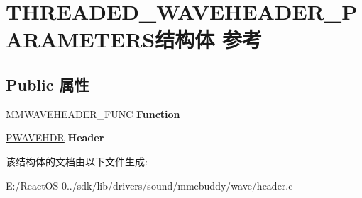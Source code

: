 \hypertarget{struct_t_h_r_e_a_d_e_d___w_a_v_e_h_e_a_d_e_r___p_a_r_a_m_e_t_e_r_s}{}\section{T\+H\+R\+E\+A\+D\+E\+D\+\_\+\+W\+A\+V\+E\+H\+E\+A\+D\+E\+R\+\_\+\+P\+A\+R\+A\+M\+E\+T\+E\+R\+S结构体 参考}
\label{struct_t_h_r_e_a_d_e_d___w_a_v_e_h_e_a_d_e_r___p_a_r_a_m_e_t_e_r_s}
\subsection*{Public 属性}
\begin{DoxyCompactItemize}
\item 
\mbox{\label{struct_t_h_r_e_a_d_e_d___w_a_v_e_h_e_a_d_e_r___p_a_r_a_m_e_t_e_r_s_a52cad5b3f932d0a6714917d86fadb4b5}} 
M\+M\+W\+A\+V\+E\+H\+E\+A\+D\+E\+R\+\_\+\+F\+U\+NC {\bfseries Function}
\item 
\mbox{\label{struct_t_h_r_e_a_d_e_d___w_a_v_e_h_e_a_d_e_r___p_a_r_a_m_e_t_e_r_s_a8d3acefd83d034fa3198dc383e9062bc}} 
\hyperlink{structwavehdr__tag}{P\+W\+A\+V\+E\+H\+DR} {\bfseries Header}
\end{DoxyCompactItemize}


该结构体的文档由以下文件生成\+:\begin{DoxyCompactItemize}
\item 
E\+:/\+React\+O\+S-\/0../sdk/lib/drivers/sound/mmebuddy/wave/header.\+c\end{DoxyCompactItemize}
